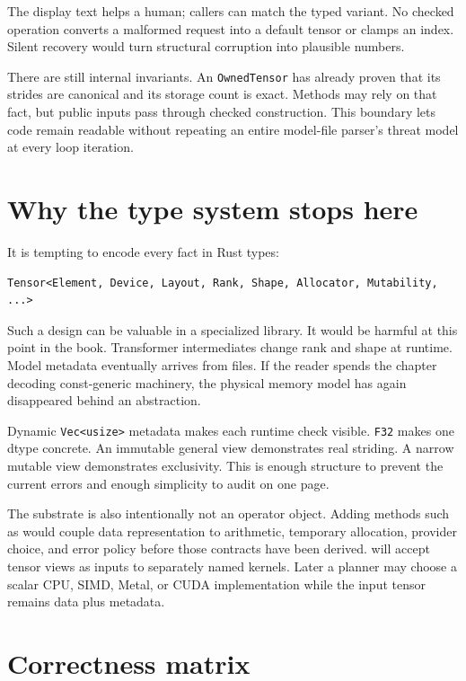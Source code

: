 The display text helps a human; callers can match the typed variant. No
checked operation converts a malformed request into a default tensor or
clamps an index. Silent recovery would turn structural corruption into
plausible numbers.

There are still internal invariants. An \texttt{OwnedTensor} has already
proven that its strides are canonical and its storage count is exact.
Methods may rely on that fact, but public inputs pass through checked
construction. This boundary lets code remain readable without repeating
an entire model-file parser's threat model at every loop iteration.

\section{Why the type system stops
here}\label{why-the-type-system-stops-here}

It is tempting to encode every fact in Rust types:

\begin{verbatim}
Tensor<Element, Device, Layout, Rank, Shape, Allocator, Mutability, ...>
\end{verbatim}

Such a design can be valuable in a specialized library. It would be
harmful at this point in the book. Transformer intermediates change rank
and shape at runtime. Model metadata eventually arrives from files. If
the reader spends the chapter decoding const-generic machinery, the
physical memory model has again disappeared behind an abstraction.

Dynamic \texttt{Vec\textless{}usize\textgreater{}} metadata makes each
runtime check visible. \texttt{F32} makes one dtype concrete. An
immutable general view demonstrates real striding. A narrow mutable view
demonstrates exclusivity. This is enough structure to prevent the
current errors and enough simplicity to audit on one page.

The substrate is also intentionally not an operator object. Adding
methods such as \texttt{} would couple
data representation to arithmetic, temporary allocation, provider
choice, and error policy before those contracts have been derived.
 will accept tensor views as inputs to separately named
kernels. Later a planner may choose a scalar CPU, SIMD, Metal, or CUDA
implementation while the input tensor remains data plus metadata.

\section{Correctness matrix}\label{correctness-matrix}

